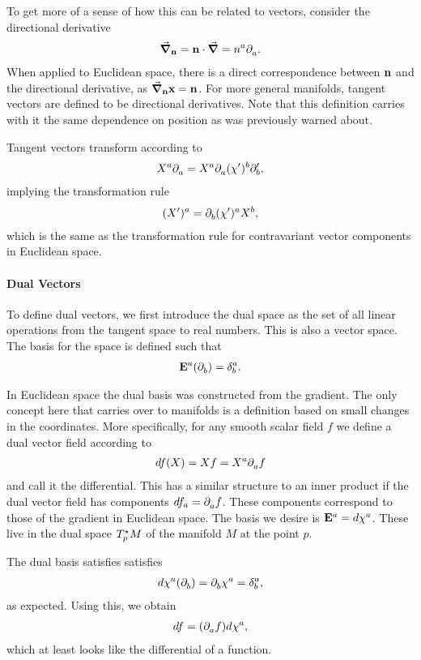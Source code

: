 To get more of a sense of how this can be related to vectors, consider the directional derivative
\begin{align*}
	\grad_{\vb{n}} = \vb{n}\cdot\grad = n^{a}\del{a}{}.
\end{align*}
When applied to Euclidean space, there is a direct correspondence between $\vb{n}$ and the directional derivative, as $\grad_{\vb{n}}{\vb{x}} = \vb{n}$. For more general manifolds, tangent vectors are defined to be directional derivatives. Note that this definition carries with it the same dependence on position as was previously warned about.

Tangent vectors transform according to
\begin{align*}
	X^{a}\del{a}{} = X^{a}\del{a}{(\chi^{\prime})^{b}}\del[\prime]{b}{},
\end{align*}
implying the transformation rule
\begin{align*}
	(X^{\prime})^{a} = \del{b}{(\chi^{\prime})^{a}}X^{b},
\end{align*}
which is the same as the transformation rule for contravariant vector components in Euclidean space.

\paragraph{Dual Vectors}
To define dual vectors, we first introduce the dual space as the set of all linear operations from the tangent space to real numbers. This is also a vector space. The basis for the space is defined such that
\begin{align*}
	\db{a}(\del{b}{}) = \kdelta{b}{a}.
\end{align*}

In Euclidean space the dual basis was constructed from the gradient. The only concept here that carries over to manifolds is a definition based on small changes in the coordinates. More specifically, for any smooth scalar field $f$ we define a dual vector field according to
\begin{align*}
	df(X) = Xf = X^{a}\del{a}{f}
\end{align*}
and call it the differential. This has a similar structure to an inner product if the dual vector field has components $df_{a} = \del{a}{f}$. These components correspond to those of the gradient in Euclidean space. The basis we desire is $\db{a} = d\chi^{a}$. These live in the dual space $\ds{p}{M}$ of the manifold $M$ at the point $p$.

The dual basis satisfies satisfies
\begin{align*}
	d\chi^{a}(\del{b}{}) = \del{b}{\chi^{a}} = \kdelta{b}{a},
\end{align*}
as expected. Using this, we obtain
\begin{align*}
	df = (\del{a}{f})d\chi^{a},
\end{align*}
which at least looks like the differential of a function.

